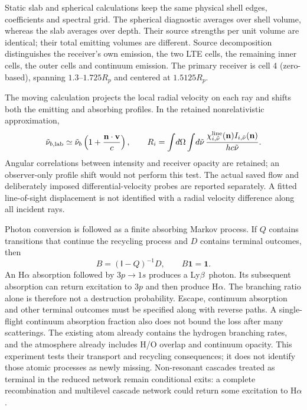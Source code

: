 \documentclass[11pt]{article}
\newcommand{\Ha}{H$\alpha$}
\newcommand{\Lb}{Ly$\beta$}
\begin{document}
Static slab and spherical calculations keep the same physical shell edges,
coefficients and spectral grid. The spherical diagnostic averages over shell
volume, whereas the slab averages over depth. Their source strengths per
unit volume are identical; their total emitting volumes are different.
Source decomposition distinguishes the receiver's own emission, the two LTE
cells, the remaining inner cells, the outer cells and continuum emission.
The primary receiver is cell 4 (zero-based), spanning $1.3$--$1.725 R_p$ and
centered at $1.5125 R_p$.

The moving calculation projects the local radial velocity on each ray and
shifts both the emitting and absorbing profiles. In the retained
nonrelativistic approximation,
\begin{equation}
 \tilde\nu_{b,\mathrm{lab}}\simeq
 \tilde\nu_b\left(1+\frac{\mathbf n\cdot\mathbf v}{c}\right),\qquad
 R_i=\int\!d\Omega\int\!d\tilde\nu\,
 \frac{\chi^{\rm line}_{i,\tilde\nu}(\mathbf n)
 I_{i,\tilde\nu}(\mathbf n)}{hc\tilde\nu}.
 \label{eq:moving}
\end{equation}
Angular correlations between intensity and receiver opacity are retained;
an observer-only profile shift would not perform this test. The actual saved
flow and deliberately imposed differential-velocity probes are reported
separately. A fitted line-of-sight displacement is not identified with a
radial velocity difference along all incident rays.

Photon conversion is followed as a finite absorbing Markov process. If $Q$
contains transitions that continue the recycling process and $D$ contains
terminal outcomes, then
\begin{equation}
 B=(\mathsf I-Q)^{-1}D,\qquad B\mathbf 1=\mathbf 1 .
 \label{eq:recycling}
\end{equation}
An H$\alpha$ absorption followed by $3p\rightarrow1s$ produces a \Lb\ photon.
Its subsequent absorption can return excitation to $3p$ and then produce
\Ha. The branching ratio alone is therefore not a destruction probability.
Escape, continuum absorption and other terminal outcomes must be specified
along with reverse paths. A single-flight continuum absorption fraction
also does not bound the loss after many scatterings.
The existing atom already contains the hydrogen branching rates, and the
atmosphere already includes H/O overlap and continuum opacity. This experiment
tests their transport and recycling consequences; it does not identify those
atomic processes as newly missing. Non-resonant cascades treated as terminal
in the reduced network remain conditional exits: a complete recombination
and multilevel cascade network could return some excitation to \Ha.
\end{document}
